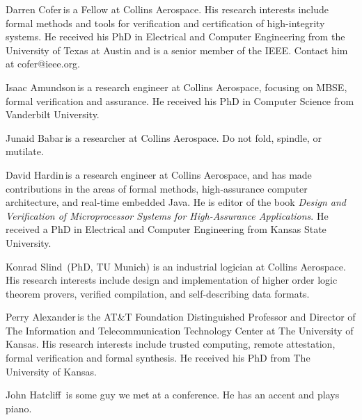 \begin{IEEEbiography}{Darren Cofer}{\,}is a Fellow at Collins Aerospace. His research interests include formal methods and tools for verification and certification of high-integrity systems. He received his PhD in Electrical and Computer Engineering from the University of Texas at Austin and is a senior member of the IEEE. Contact him at cofer@ieee.org.
\end{IEEEbiography}

\begin{IEEEbiography}{Isaac Amundson}{\,}is a research engineer at Collins Aerospace, focusing on MBSE, formal verification and assurance.  He received his PhD in Computer Science from Vanderbilt University.
\end{IEEEbiography}

\begin{IEEEbiography}{Junaid Babar}{\,}is a researcher at Collins Aerospace.
Do not fold, spindle, or mutilate.  
\end{IEEEbiography}

\begin{IEEEbiography}{David Hardin}{\,}is a research engineer
  at Collins Aerospace, and has made contributions in
  the areas of formal methods, high-assurance computer architecture,
  and real-time embedded Java.  He is editor of the book \emph{Design
    and Verification of Microprocessor Systems for High-Assurance
    Applications}.  He received a PhD in Electrical and Computer
  Engineering from Kansas State University.
\end{IEEEbiography}

\begin{IEEEbiography}{Konrad Slind}{\,} (PhD, TU Munich) is an industrial logician at Collins Aerospace.
  His research interests include design and implementation of higher
  order logic theorem provers, verified compilation, and
  self-describing data formats.
\end{IEEEbiography}

\begin{IEEEbiography}{Perry Alexander}{\,}is the AT\&T Foundation
  Distinguished Professor and Director of The Information and
  Telecommunication Technology Center at The University of Kansas.
  His research interests include trusted computing, remote
  attestation, formal verification and formal synthesis. He received
  his PhD from The University of Kansas.
\end{IEEEbiography}

\begin{IEEEbiography}{John Hatcliff}{\,}
is some guy we met at a conference.  He has an accent and plays piano.  
\end{IEEEbiography}

